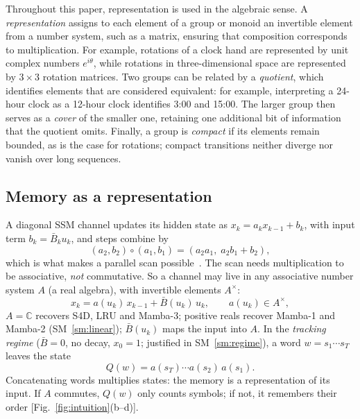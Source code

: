 \documentclass[aps,prx,reprint,superscriptaddress,longbibliography,nofootinbib,floatfix]{revtex4-2}
\newcommand{\CC}{\mathbb{C}}
\theoremstyle{plain}
\theoremstyle{definition}
\begin{document}
Throughout this paper, representation is used in the algebraic sense. A \textit{representation} assigns to each element of a group or monoid an invertible element from a number system, such as a matrix, ensuring that composition corresponds to multiplication. For example, rotations of a clock hand are represented by unit complex
numbers $e^{i\theta}$, while rotations in three-dimensional space are represented by $3\times3$ rotation
matrices. Two groups can be related by a \textit{quotient}, which identifies elements
that are considered equivalent: for example, interpreting a 24-hour clock as a 12-hour
clock identifies 3:00 and 15:00. The larger group then serves as a \textit{cover} of the
smaller one, retaining one additional bit of information that the quotient omits. Finally,
a group is \textit{compact} if its elements remain bounded, as is the case for rotations;
compact transitions neither diverge nor vanish over long sequences.


\subsection{Memory as a representation}
A diagonal SSM channel updates its hidden state as
$x_k = a_k x_{k-1} + b_k$, with input term $b_k=\bar B_k u_k$, and steps combine by
\begin{equation}
(a_2,b_2)\circ(a_1,b_1) = (a_2a_1,\;a_2b_1+b_2),
\label{eq:combine}
\end{equation}
which is what makes a parallel scan possible~\cite{blelloch,martin_cundy}.
The scan needs multiplication to be associative, \emph{not} commutative.
So a channel may live in any associative number system $A$ (a real
algebra), with invertible elements $A^\times$:
\begin{equation}
x_k = a(u_k)\,x_{k-1} + \bar B(u_k)\,u_k, \qquad a(u_k)\in A^\times,
\label{eq:channel}
\end{equation}
$A=\CC$ recovers S4D, LRU and Mamba-3; positive reals recover Mamba-1 and
Mamba-2 (SM~\ref{sm:linear}); $\bar B(u_k)$ maps the input into $A$. In the
\emph{tracking regime} ($\bar B=0$, no decay, $x_0=1$; justified in
SM~\ref{sm:regime}), a word $w=s_1\cdots s_T$
leaves the state
\begin{equation}
Q(w) = a(s_T)\cdots a(s_2)\,a(s_1).
\label{eq:product}
\end{equation}
Concatenating words multiplies states: the memory is a representation of
its input. If $A$ commutes, $Q(w)$ only counts symbols; if not, it
remembers their order [Fig.~\ref{fig:intuition}(b--d)].
\end{document}
